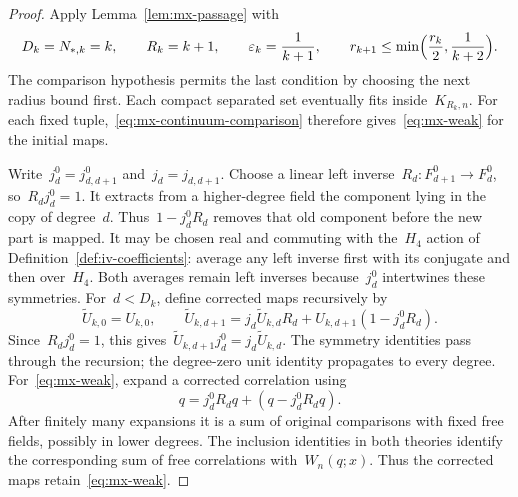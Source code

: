 \begin{proof}
Apply Lemma~\ref{lem:mx-passage} with
\begin{equation*}
 D_k=N_{*,k}=k,\qquad R_k=k+1,\qquad
 \varepsilon_k=\frac{1}{k+1},\qquad
 r_{k+1}\le\min\Bigl(\frac{r_k}{2},\frac{1}{k+2}\Bigr).
\end{equation*}
The comparison hypothesis permits the last condition by choosing the next radius bound first.
Each compact separated set eventually fits inside~$K_{R_k,n}$.
For each fixed tuple,~\eqref{eq:mx-continuum-comparison} therefore gives~\eqref{eq:mx-weak} for the initial maps.

Write~$j_d^0=j^0_{d,d+1}$ and~$j_d=j_{d,d+1}$.
Choose a linear left inverse~$R_d:F_{d+1}^0\to F_d^0$, so~$R_dj_d^0=1$.
It extracts from a higher-degree field the component lying in the copy of degree~$d$. Thus~$1-j_d^0R_d$ removes that old component before the new part is mapped.
It may be chosen real and commuting with the~$H_4$ action of Definition~\ref{def:iv-coefficients}: average any left inverse first with its conjugate and then over~$H_4$.
Both averages remain left inverses because~$j_d^0$ intertwines these symmetries.
For~$d<D_k$, define corrected maps recursively by
\begin{equation}\label{eq:mx-correction}
 \widetilde U_{k,0}=U_{k,0},\qquad
 \widetilde U_{k,d+1}
 =j_d\widetilde U_{k,d}R_d
   +U_{k,d+1}(1-j_d^0R_d).
\end{equation}
Since~$R_dj_d^0=1$, this gives~$\widetilde U_{k,d+1}j_d^0=j_d\widetilde U_{k,d}$.
The symmetry identities pass through the recursion; the degree-zero unit identity propagates to every degree.
For~\eqref{eq:mx-weak}, expand a corrected correlation using
\begin{equation*}
 q=j_d^0R_dq+(q-j_d^0R_dq).
\end{equation*}
After finitely many expansions it is a sum of original comparisons with fixed free fields, possibly in lower degrees.
The inclusion identities in both theories identify the corresponding sum of free correlations with~$W_n(q;x)$.
Thus the corrected maps retain~\eqref{eq:mx-weak}.


\end{proof}
